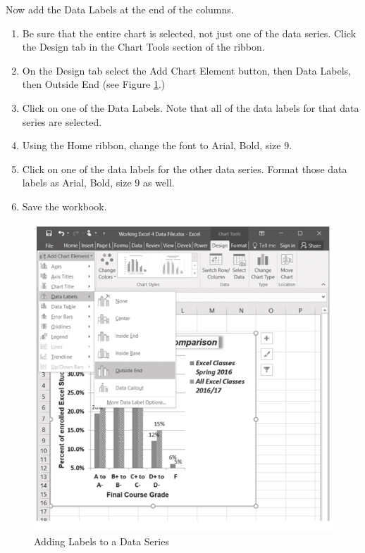 Now add the Data Labels at the end of the columns.

\begin{enumerate}
	\item Be sure that the entire chart is selected, not just one of the data series. Click the Design tab in the Chart Tools section of the ribbon.
	\item On the Design tab select the Add Chart Element button, then Data Labels, then Outside End (see Figure \ref{04:fig37}.)
	\item Click on one of the Data Labels. Note that all of the data labels for that data series are selected.
	\item Using the Home ribbon, change the font to Arial, Bold, size $ 9 $.
	\item Click on one of the data labels for the other data series. Format those data labels as Arial, Bold, size $ 9 $ as well.
	\item Save the workbook.
\end{enumerate}

\begin{figure}[H]
	\centering
	\includegraphics[width=\maxwidth{.95\linewidth}]{gfx/ch04_fig37}
	\caption{Adding Labels to a Data Series}
	\label{04:fig37}
\end{figure}

